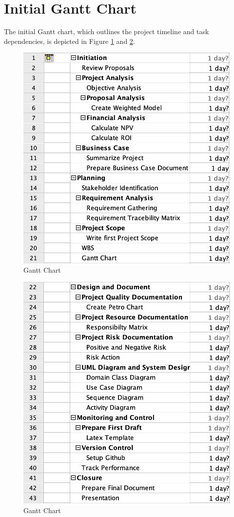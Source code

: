 \section{Initial Gantt Chart}

The initial Gantt chart, which outlines the project timeline and task dependencies, is depicted in Figure \ref{fig:gnt1} and \ref{fig:gnt2}.

\begin{figure}[ht]
    \includegraphics[width=\textwidth]{images/gantt_2.png}
    \caption{Gantt Chart}
    \label{fig:gnt1}
\end{figure}

\begin{figure}[ht]
    \includegraphics[width=\textwidth]{images/gantt_1.png}
    \caption{Gantt Chart}
    \label{fig:gnt2}
\end{figure}

\FloatBarrier
\newpage